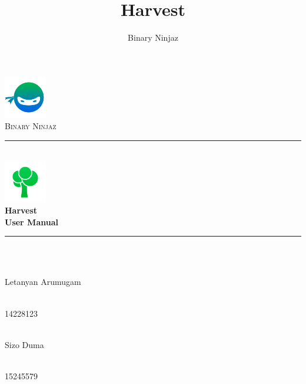 \documentclass[11pt]{article}
\author{Binary Ninjaz}
\title{Harvest}
\begin{document}
\begin{titlepage}

	\begin{center}
		\includegraphics[height=5em]{Images/Bin.png}\\
		\textsc{\LARGE Binary Ninjaz}\\[0.3cm]
		\rule{\linewidth}{0.5mm} \\[0.5cm]
		\includegraphics[height=5em]{Images/Icon.png}\\
		{ \huge \bfseries Harvest \\
		  \vspace{0.3cm}\large \bfseries User Manual}\\[0.5cm]
		\rule{\linewidth}{0.5mm} \\[1cm]


		\begin{minipage}{0.4\textwidth}
			\begin{flushleft} \large
				\emph{} \\
				Letanyan {Arumugam}
			\end{flushleft}
		\end{minipage}
		\begin{minipage}{0.4\textwidth}
			\begin{flushright} \large
				\emph{} \\
				14228123
			\end{flushright}
		\end{minipage}

		\begin{minipage}{0.4\textwidth}
			\begin{flushleft} \large
            	\emph{} \\
				Sizo {Duma}
			\end{flushleft}
		\end{minipage}
		\begin{minipage}{0.4\textwidth}
			\begin{flushright} \large
				\emph{} \\
				15245579
			\end{flushright}
		\end{minipage}


\end{center}
\end{titlepage}
\end{document}
